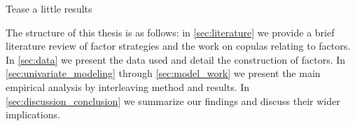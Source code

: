 Tease a little results
 
The structure of this thesis is as follows: in \autoref{sec:literature} we provide a brief literature review of factor strategies and the work on copulas relating to factors. In \autoref{sec:data} we present the data used and detail the construction of factors. In \autoref{sec:univariate_modeling} through \autoref{sec:model_work}  we present the main empirical analysis by interleaving method and results. In \autoref{sec:discussion_conclusion} we summarize our findings and discuss their wider implications.